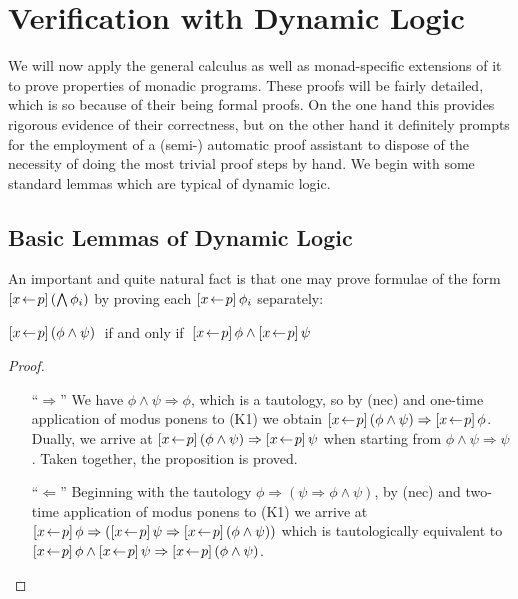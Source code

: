 
\chapter{Verification with Dynamic Logic}
\label{cha:application}

We will now apply the general calculus as well as monad-specific extensions of
it to prove properties of monadic programs. These proofs will be fairly
detailed, which is so because of their being formal proofs. On the one hand this
provides rigorous evidence of their correctness, but on the other hand it 
definitely prompts for the employment of a \mbox{(semi-)} automatic proof assistant to
dispose of the necessity of doing the most trivial proof steps by hand. We begin
with some standard lemmas which are typical of dynamic logic.


\section{Basic Lemmas of Dynamic Logic}
\label{sec:basic-lemmas}

An important and quite natural fact is that one may prove formulae of the form
$[x\!\gets\! p]\,{(\bigwedge\phi_i)}$ by proving each $[x\!\gets\! p]\,{\phi_i}$ separately:
\begin{lem}
\label{thm:box-and-distrib}
 $[x\!\gets\! p]\,(\phi \land \psi)\;$ if and only if $\;[x\!\gets\! p]\,\phi \land
 [x\!\gets\! p]\, \psi$
\end{lem}

\begin{proof}
\begin{itemize}
\item[``$\Rightarrow$''] We have $\phi \land \psi \Rightarrow \phi$, which is a tautology, so by (nec) and
  one-time application of modus ponens to (K1) we obtain $[x\!\gets\! p]\,(\phi \land
  \psi) \Rightarrow [x\!\gets\! p]\,\phi$.  Dually, we arrive at $[x\!\gets\! p]\,(\phi \land \psi) \Rightarrow
  [x\!\gets\! p]\,\psi$ when starting from $\phi \land \psi \Rightarrow \psi$. Taken together, the
  proposition is proved.

\item[``$\Leftarrow$''] Beginning with the tautology $\phi \Rightarrow (\psi \Rightarrow \phi \land \psi)$, by (nec) and
  two-time application of modus ponens to (K1) we arrive at $[x\!\gets\! p]\,\phi
  \Rightarrow ([x\!\gets\! p]\,\psi \Rightarrow [x\!\gets\! p]\,(\phi \land \psi))$ which is tautologically
  equivalent to $[x\!\gets\! p]\, \phi \land [x\!\gets\! p]\, \psi \Rightarrow [x\!\gets\!
    p]\,(\phi \land \psi)$.
\end{itemize}
\end{proof}

